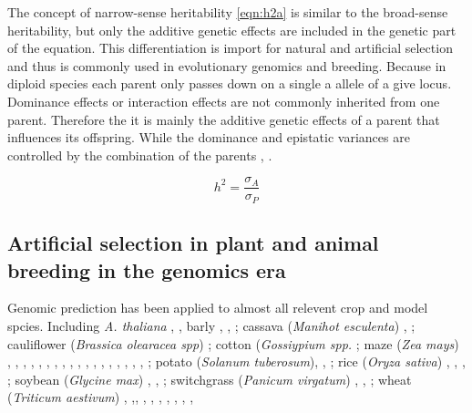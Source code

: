The concept of narrow-sense heritability \ref{eqn:h2a} is similar to the broad-sense heritability, but only the additive genetic
effects are included in the genetic part of the equation. This differentiation is import for natural and artificial selection and
thus is commonly used in evolutionary genomics and breeding. Because in diploid species each parent only passes down on a single a
allele of a give locus. Dominance effects or interaction effects are not commonly inherited from one parent. Therefore the it is
mainly the additive genetic effects of a parent that influences its offspring. While the dominance and epistatic variances are
controlled by the combination of the parents \cite{falconer1996}, \cite{walsh2018}.


\begin{equation}
  h^2 = \frac{\sigma_{A}}{\sigma_{P}}
  \label{eqn:h2a}
\end{equation}



\subsection{Artificial selection in plant and animal breeding in the genomics era}

Genomic prediction has been applied to almost all relevent crop and model spcies. Including \textit{A. thaliana}
\cite{hu2015}, \cite{shen2013novel}, barly \cite{neyhart2019}, \cite{oakey2016} , \cite{zhong2009factors} ;
cassava (\textit{Manihot esculenta}) \cite{elias2018}, \cite{elias2018improving} ;
cauliflower (\textit{Brassica olearacea spp})   \cite{thorwarth2018genomic} ;
cotton (\textit{Gossiypium spp.}  \cite{gapare2018} ;
maze (\textit{Zea mays}) \cite{moeinizade2019} , \cite{allier2019usefulness} , \cite{brauner2018genomic},
\cite{schrag2018beyond}, \cite{schopp2017genomic}, \cite{e2017genomic}, \cite{schopp2017accuracy},
\cite{kadam2016genomic}, \cite{bustos2016improvement}, \cite{montesinos2015threshold}, \cite{owens2014foundation},
\cite{lehermeier2014usefulness},
\cite{technow2014genome}, \cite{peiffer2014genetic} , \cite{riedelsheimer2013genomic}, \cite{guo2013accuracy},
\cite{technow2013genomic}, \cite{windhausen2012} , \cite{rincent2012} ;
potato (\textit{Solanum tuberosum}),  \cite{enciso2018genomic}, \cite{Endelman2018pot} ;
rice (\textit{Oryza sativa}) \cite{Momen2019}, \cite{BenHassen2018}, \cite{Xu2013rice}, \cite{Grenier2015} ;
soybean (\textit{Glycine max}) \cite{Stewart_Brown_2019} , \cite{Jarquin_2016}, \cite{Xavier_2016} ; 
switchgrass (\textit{Panicum virgatum}) \cite{Poudel_2019}  ,\cite{Ramstein_2019} , \cite{Ramstein_2016} ;
wheat (\textit{Triticum aestivum}) \cite{Cuevas_2019} , \cite{Howard_2019} ,\cite{Krause_2019}, \cite{Rincent_2018},
\cite{Norman_2018}, \cite{Belamkar_2018}, \cite{Ovenden_2018}, \cite{Sukumaran_2016}, \cite{}, \cite{},



